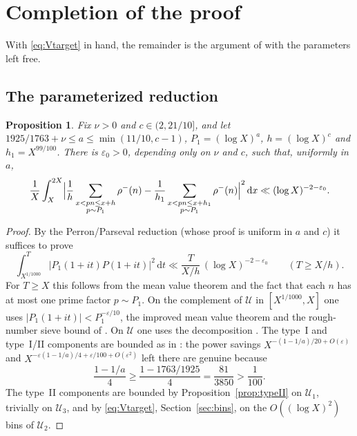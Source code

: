 \documentclass[11pt,a4paper]{amsart}
\newtheorem{proposition}[theorem]{Proposition}
\theoremstyle{definition}
\newcommand{\e}{\varepsilon}
\newcommand{\dd}{\,\mathrm d}
\newcommand{\1}{\mathbf 1}
\newcommand{\cU}{\mathcal U}
\begin{document}
\section{Completion of the proof}\label{sec:completion}

With \eqref{eq:Vtarget} in hand, the remainder is the argument of
\cite[Sections~2 and~5]{MT} with the parameters left free.

\subsection{The parameterized reduction}

\begin{proposition}\label{prop:variance}
Fix \(\nu>0\) and \(c\in(2,21/10]\), and let
\(1925/1763+\nu\le a\le\min(11/10,c-1)\), \(P_1=(\log X)^a\),
\(h=(\log X)^c\) and \(h_1=X^{99/100}\).  There is \(\e_0>0\),
depending only on \(\nu\) and \(c\), such that, uniformly in \(a\),
\[
 \frac1X\int_X^{2X}\Bigl|\frac1h\sum_{\substack{x<pn\le x+h\\p\sim P_1}}\rho^-(n)
 -\frac1{h_1}\sum_{\substack{x<pn\le x+h_1\\p\sim P_1}}\rho^-(n)\Bigr|^2\dd x
 \ll(\log X)^{-2-\e_0}.
\]
\end{proposition}

\begin{proof}
By the Perron/Parseval reduction \cite[Lemma~3.1]{MT} (whose proof is
uniform in \(a\) and \(c\)) it suffices to prove
\[
 \int_{X^{1/1000}}^T|P_1(1+it)P(1+it)|^2\dd t
 \ll\frac{T}{X/h}\,(\log X)^{-2-\e_0}\qquad(T\ge X/h).
\]
For \(T\ge X\) this follows from the mean value theorem and the fact that
each \(n\) has at most one prime factor \(p\sim P_1\).  On the complement
of \(\cU\) in \([X^{1/1000},X]\) one uses \(|P_1(1+it)|<P_1^{-\e/10}\),
the improved mean value theorem \cite[Lemma~3.3]{MT} and the
rough-number sieve bound of \cite[Section~5]{MT}.  On \(\cU\) one uses
the decomposition \cite[Proposition~2.2]{MT}.  The type~I and type~I/II
components are bounded as in \cite[Sections~5.1, 5.2]{MT}: the power
savings \(X^{-(1-1/a)/20+O(\e)}\) and
\(X^{-\e(1-1/a)/4+\e/100+O(\e^2)}\) left there are genuine because
\[
 \frac{1-1/a}{4}\ge\frac{1-1763/1925}{4}=\frac{81}{3850}>\frac1{100}.
\]
The type~II components are bounded by Proposition~\ref{prop:typeII} on
\(\cU_1\), trivially on \(\cU_3\), and by \eqref{eq:Vtarget},
Section~\ref{sec:bins}, on the \(O((\log X)^2)\) bins of \(\cU_2\).
\end{proof}
\end{document}
